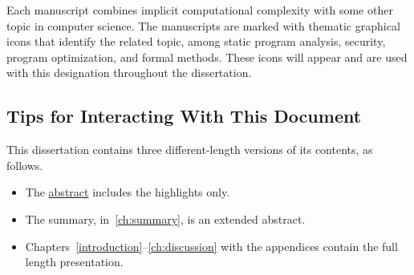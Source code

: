 Each manuscript combines implicit computational complexity with some other topic in computer science.
The manuscripts are marked with thematic graphical icons that identify the related topic, among static program analysis, security, program optimization, and formal methods.
These icons will appear and are used with this designation throughout the dissertation.



\subsection{Tips for Interacting With This Document}
\label{subsec:tips}

This dissertation contains three different-length versions of its contents, as follows.

\begin{itemize}
\item The \hyperref[abs]{abstract} includes the highlights only.
\item The summary, in~\autoref{ch:summary}, is an extended abstract.
\item Chapters~\ref{introduction}--\ref{ch:discussion} with the appendices contain the full length presentation.
\end{itemize}

